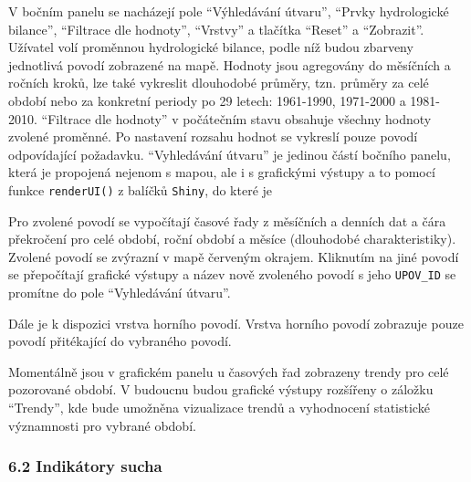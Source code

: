\documentclass[12pt,]{article}
\newenvironment{Shaded}{\begin{snugshade}}{\end{snugshade}}
\newcommand{\KeywordTok}[1]{\textcolor[rgb]{0.13,0.29,0.53}{\textbf{#1}}}
\newcommand{\DataTypeTok}[1]{\textcolor[rgb]{0.13,0.29,0.53}{#1}}
\newcommand{\StringTok}[1]{\textcolor[rgb]{0.31,0.60,0.02}{#1}}
\newcommand{\OperatorTok}[1]{\textcolor[rgb]{0.81,0.36,0.00}{\textbf{#1}}}
\newcommand{\NormalTok}[1]{#1}
\begin{document}
\qquad V bočním panelu se nacházejí pole \enquote{Výhledávání útvaru},
\enquote{Prvky hydrologické bilance}, \enquote{Filtrace dle hodnoty},
\enquote{Vrstvy} a tlačítka \enquote{Reset} a \enquote{Zobrazit}.
Užívatel volí proměnnou hydrologické bilance, podle níž budou zbarveny
jednotlivá povodí zobrazené na mapě. Hodnoty jsou agregovány do
měsíčních a ročních kroků, lze také vykreslit dlouhodobé průměry, tzn.
průměry za celé období nebo za konkretní periody po 29 letech:
1961-1990, 1971-2000 a 1981-2010. \enquote{Filtrace dle hodnoty} v
počátečním stavu obsahuje všechny hodnoty zvolené proměnné. Po nastavení
rozsahu hodnot se vykreslí pouze povodí odpovídající požadavku.
\enquote{Vyhledávání útvaru} je jedinou částí bočního panelu, která je
propojená nejenom s mapou, ale i s grafickými výstupy a to pomocí funkce
\texttt{renderUI()} z balíčků \texttt{Shiny}, do které je

\begin{Shaded}
\end{Shaded}

Pro zvolené povodí se vypočítají časové řady z měsíčních a denních dat a
čára překročení pro celé období, roční období a měsíce (dlouhodobé
charakteristiky). Zvolené povodí se zvýrazní v mapě červeným okrajem.
Kliknutím na jiné povodí se přepočítají grafické výstupy a název nově
zvoleného povodí s jeho \texttt{UPOV\_ID} se promítne do pole
\enquote{Vyhledávání útvaru}.

Dále je k dispozici vrstva horního povodí. Vrstva horního povodí
zobrazuje pouze povodí přitékající do vybraného povodí.

Momentálně jsou v grafickém panelu u časových řad zobrazeny trendy pro
celé pozorované období. V budoucnu budou grafické výstupy rozšířeny o
záložku \enquote{Trendy}, kde bude umožněna vizualizace trendů a
vyhodnocení statistické významnosti pro vybrané období.

\subsubsection{6.2 Indikátory sucha}\label{indikatory-sucha}
\end{document}
